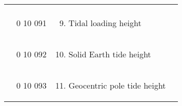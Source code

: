 \begin{longtable}[]{@{}llll@{}}
\begin{minipage}[t]{0.22\columnwidth}
\strut
\end{minipage}\tabularnewline
\begin{minipage}[t]{0.22\columnwidth}\raggedright
\strut
\end{minipage} & \begin{minipage}[t]{0.22\columnwidth}\raggedright
0 10 091\strut
\end{minipage} & \begin{minipage}[t]{0.22\columnwidth}\raggedright
\begin{enumerate}
\setcounter{enumi}{8}
\item
  Tidal loading height
\end{enumerate}\strut
\end{minipage} & \begin{minipage}[t]{0.22\columnwidth}\raggedright
\strut
\end{minipage}\tabularnewline
\begin{minipage}[t]{0.22\columnwidth}\raggedright
\strut
\end{minipage} & \begin{minipage}[t]{0.22\columnwidth}\raggedright
0 10 092\strut
\end{minipage} & \begin{minipage}[t]{0.22\columnwidth}\raggedright
\begin{enumerate}
\setcounter{enumi}{9}
\item
  Solid Earth tide height
\end{enumerate}\strut
\end{minipage} & \begin{minipage}[t]{0.22\columnwidth}\raggedright
\strut
\end{minipage}\tabularnewline
\begin{minipage}[t]{0.22\columnwidth}\raggedright
\strut
\end{minipage} & \begin{minipage}[t]{0.22\columnwidth}\raggedright
0 10 093\strut
\end{minipage} & \begin{minipage}[t]{0.22\columnwidth}\raggedright
\begin{enumerate}
\setcounter{enumi}{10}
\item
  Geocentric pole tide height
\end{enumerate}\strut
\end{minipage} & \begin{minipage}[t]{0.22\columnwidth}\raggedright
\strut
\end{minipage}\tabularnewline

\end{longtable}
